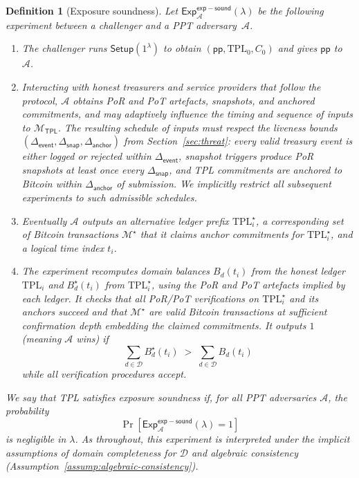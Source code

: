 \documentclass[11pt]{article}
\newtheorem{definition}{Definition}
\begin{document}
\begin{definition}[Exposure soundness]
\label{def:exp-soundness}
Let $\mathsf{Exp}^{\mathsf{exp-sound}}_{\mathcal{A}}(\lambda)$ be the following
experiment between a challenger and a PPT adversary~$\mathcal{A}$.
\begin{enumerate}[noitemsep]
  \item The challenger runs $\mathsf{Setup}(1^\lambda)$ to obtain
        $(\mathsf{pp},\mathrm{TPL}_0,C_0)$ and gives $\mathsf{pp}$ to~$\mathcal{A}$.
  \item Interacting with honest treasurers and service providers that follow
        the protocol, $\mathcal{A}$ obtains PoR and PoT artefacts, snapshots,
        and anchored commitments, and may adaptively influence the timing and
        sequence of inputs to $\mathcal{M}_{\mathsf{TPL}}$.
        The resulting schedule of inputs must respect the liveness bounds
        $(\Delta_{\mathsf{event}},\Delta_{\mathsf{snap}},\Delta_{\mathsf{anchor}})$
        from Section~\ref{sec:threat}: every valid treasury event is either logged or
        rejected within $\Delta_{\mathsf{event}}$, snapshot triggers produce PoR snapshots
        at least once every $\Delta_{\mathsf{snap}}$, and TPL commitments are anchored
        to Bitcoin within $\Delta_{\mathsf{anchor}}$ of submission. We implicitly restrict all subsequent experiments to such admissible schedules.
  \item Eventually $\mathcal{A}$ outputs an alternative ledger prefix
        $\mathrm{TPL}^\star_i$, a corresponding set of Bitcoin transactions
        $\mathcal{M}^\star$ that it claims anchor commitments for
        $\mathrm{TPL}^\star_i$, and a logical time index $t_i$.
  \item The experiment recomputes domain balances $B_d(t_i)$ from the honest
        ledger $\mathrm{TPL}_i$ and $B_d^\star(t_i)$ from $\mathrm{TPL}^\star_i$,
        using the PoR and PoT artefacts implied by each ledger.
        It checks that all PoR/PoT verifications on $\mathrm{TPL}^\star_i$ and
        its anchors succeed and that $\mathcal{M}^\star$ are valid Bitcoin
        transactions at sufficient confirmation depth embedding the claimed
        commitments.
        It outputs $1$ (meaning $\mathcal{A}$ wins) if
        \[
          \sum_{d\in\mathcal{D}} B_d^\star(t_i) \;>\;
          \sum_{d\in\mathcal{D}} B_d(t_i)
        \]
        while all verification procedures accept.
\end{enumerate}
We say that TPL satisfies \emph{exposure soundness} if, for all PPT adversaries
$\mathcal{A}$, the probability
\[
  \Pr[\mathsf{Exp}^{\mathsf{exp-sound}}_{\mathcal{A}}(\lambda)=1]
\]
is negligible in $\lambda$. As throughout, this experiment is interpreted under the implicit assumptions of domain completeness for $\mathcal{D}$ and algebraic consistency (Assumption~\ref{assump:algebraic-consistency}).
\end{definition}
\end{document}
